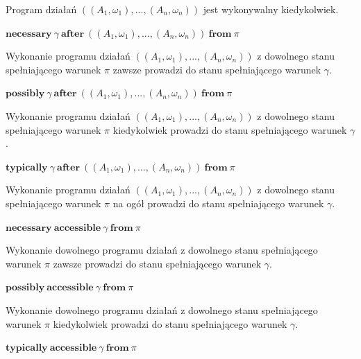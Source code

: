 \documentclass[11pt,a4paper]{article}
\begin{document}
    Program działań $((A_1, \omega_1),...,(A_n,\omega_n))$ jest wykonywalny kiedykolwiek.
    
    \begin{center}
        $\mathbf{necessary}~\gamma~\mathbf{after}~((A_1, \omega_1),...,(A_n,\omega_n))~\mathbf{from}~\pi$
    \end{center}
    
    Wykonanie programu działań $((A_1, \omega_1),...,(A_n,\omega_n))$ z dowolnego stanu spełniającego  warunek $\pi$ zawsze prowadzi do stanu spełniającego warunek $\gamma$.
    
    \begin{center}
        $\mathbf{possibly}~\gamma~\mathbf{after}~((A_1, \omega_1),...,(A_n,\omega_n))~\mathbf{from}~\pi$
    \end{center}
    
    Wykonanie programu działań $((A_1, \omega_1),...,(A_n,\omega_n))$ z dowolnego stanu spełniającego  warunek $\pi$ kiedykolwiek prowadzi do stanu spełniającego warunek $\gamma$.
    
    \begin{center}
        $\mathbf{typically}~\gamma~\mathbf{after}~((A_1, \omega_1),...,(A_n,\omega_n))~\mathbf{from}~\pi$
    \end{center}
    
    Wykonanie programu działań $((A_1, \omega_1),...,(A_n,\omega_n))$ z dowolnego stanu spełniającego  warunek $\pi$ na ogół prowadzi do stanu spełniającego warunek $\gamma$.
    
    \begin{center}
        $\mathbf{necessary}~\mathbf{accessible}~\gamma~\mathbf{from}~\pi$
    \end{center}
    
    Wykonanie dowolnego programu działań z dowolnego stanu spełniającego warunek $\pi$ zawsze prowadzi do stanu spełniającego warunek $\gamma$.
    
    \begin{center}
        $\mathbf{possibly}~\mathbf{accessible}~\gamma~\mathbf{from}~\pi$
    \end{center}
    
    Wykonanie dowolnego programu działań z dowolnego stanu spełniającego warunek $\pi$ kiedykolwiek prowadzi do stanu spełniającego warunek $\gamma$.
    
    
    \begin{center}
        $\mathbf{typically}~\mathbf{accessible}~\gamma~\mathbf{from}~\pi$
    \end{center}
    
\end{document}
